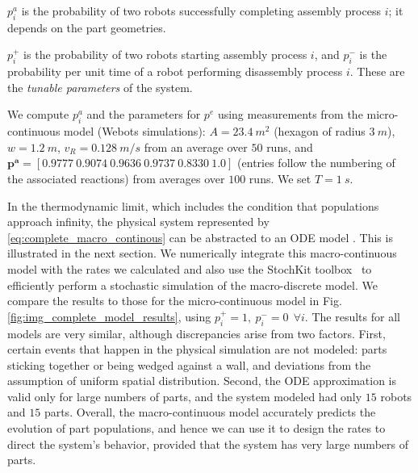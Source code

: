 

$p^a_i$ is the probability of two robots successfully completing
assembly process $i$; it depends on the part geometries.

$p_i^+$ is the probability of two robots starting assembly process
$i$, and $p_i^-$ is the probability per unit time of a robot
performing disassembly process $i$.  These are the {\it tunable
parameters} of the system.

We compute $p^a_i$ and the parameters for $p^e$ using measurements
from the micro-continuous model (Webots simulations): $A = 23.4~
m^2$ (hexagon of radius $3~m$), $w = 1.2~ m$, $v_R = 0.128~m/s$ from
an average over $50$ runs, and $\mathbf{p^a} =
[0.9777~0.9074~0.9636~0.9737~0.8330~1.0]$ (entries follow the
numbering of the associated reactions) from averages over $100$
runs.  We set $T=1 ~s$.

In the thermodynamic limit, which includes the condition that
populations approach infinity, the physical system represented by
\eqref{eq:complete_macro_continous} can be abstracted to an ODE
model \cite{Gillespie:2007p1788}.  This is illustrated in the next
section.  We numerically integrate this macro-continuous model with
the rates we calculated and also use the StochKit
toolbox~\cite{Li:2008p11431} to efficiently perform a stochastic
simulation of the macro-discrete model.  We compare the results to
those for the micro-continuous model in Fig.
\ref{fig:img_complete_model_results}, using $p_i^+=1, ~p_i^-=0 ~~
\forall i$. The results for all models are very similar, although
discrepancies arise from two factors. First, certain events that
happen in the physical simulation are not modeled: parts sticking
together or being wedged against a wall, and deviations from the
assumption of uniform spatial distribution. Second, the ODE
approximation is valid only for large numbers of parts, and the
system modeled had only $15$ robots and $15$ parts. Overall, the
macro-continuous model accurately predicts the evolution of part
populations, and hence we can use it to design the rates to direct
the system's behavior, provided that the system has very large
numbers of parts.


